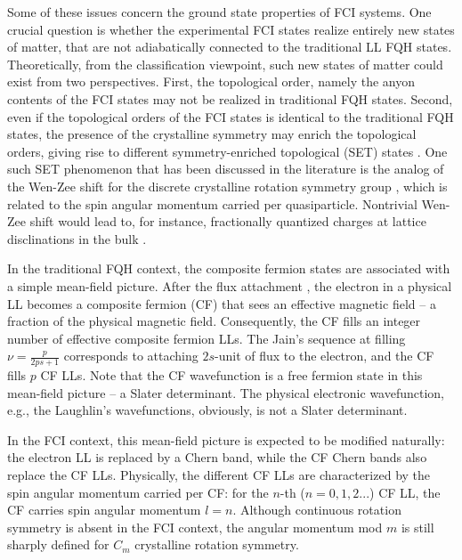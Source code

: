 Some of these issues concern the ground state properties of FCI systems. One crucial question is whether the experimental FCI states realize entirely new states of matter, that are not adiabatically connected to the traditional LL FQH states. Theoretically, from the classification viewpoint, such new states of matter could exist from two perspectives. First, the topological order, namely the anyon contents of the FCI states may not be realized in traditional FQH states. Second, even if the topological orders of the FCI states is identical to the traditional FQH states, the presence of the crystalline symmetry may enrich the topological orders, giving rise to different symmetry-enriched topological (SET) states \cite{mesaros2013classification,lu2016classification}. One such SET phenomenon that has been discussed in the literature is the analog of the Wen-Zee shift \cite{wen1992shift} for the discrete crystalline rotation symmetry group \cite{manjunath2023rotational,han2019generalized,li2020fractional,zhang2022fractional}, which is related to the spin angular momentum carried per quasiparticle. Nontrivial Wen-Zee shift would lead to, for instance, fractionally quantized charges at lattice disclinations in the bulk \cite{li2020fractional,zhang2022fractional}.

In the traditional FQH context, the composite fermion states \cite{jain1989composite} are associated with a simple mean-field picture. After the flux attachment \cite{jain1990theory}, the electron in a physical LL becomes a composite fermion (CF) that sees an effective magnetic field -- a fraction of the physical magnetic field. Consequently, the CF fills an integer number of effective composite fermion LLs. The Jain's sequence at filling $\nu=\frac{p}{2ps+1}$ corresponds to attaching $2s$-unit of flux to the electron, and the CF fills $p$ CF LLs. Note that the CF wavefunction is a free fermion state in this mean-field picture -- a Slater determinant. The physical electronic wavefunction, e.g., the Laughlin's wavefunctions, obviously, is not a Slater determinant. 

In the FCI context, this mean-field picture is expected to be modified naturally: the electron LL is replaced by a Chern band, while the CF Chern bands also replace the CF LLs. Physically, the different CF LLs are characterized by the spin angular momentum carried per CF: for the $n$-th ($n=0,1,2...$) CF LL, the CF carries spin angular momentum $l=n$. Although continuous rotation symmetry is absent in the FCI context, the angular momentum mod $m$ is still sharply defined for  $C_m$ crystalline rotation symmetry. 

